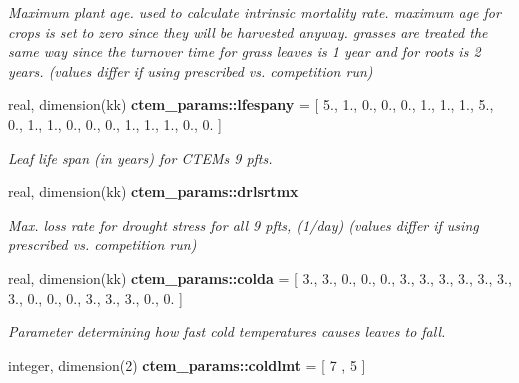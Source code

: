 \begin{DoxyCompactItemize}
\begin{DoxyCompactList}\small\item\em Maximum plant age. used to calculate intrinsic mortality rate. maximum age for crops is set to zero since they will be harvested anyway. grasses are treated the same way since the turnover time for grass leaves is 1 year and for roots is 2 years. (values differ if using prescribed vs. competition run) \end{DoxyCompactList}\item 
\hypertarget{namespacectem__params_aa093866c5338fea3488dc5cfdb9449af}{}real, dimension(kk) {\bfseries ctem\+\_\+params\+::lfespany} = \mbox{[} 5., 1., 0., 0., 0., 1., 1., 1., 5., 0., 1., 1., 0., 0., 0., 1., 1., 1., 0., 0. \mbox{]}\label{namespacectem__params_aa093866c5338fea3488dc5cfdb9449af}

\begin{DoxyCompactList}\small\item\em Leaf life span (in years) for C\+T\+E\+M\textquotesingle{}s 9 pfts. \end{DoxyCompactList}\item 
\hypertarget{namespacectem__params_adcdbf5080dbbe4117e28dad60b76a0d9}{}real, dimension(kk) {\bfseries ctem\+\_\+params\+::drlsrtmx}\label{namespacectem__params_adcdbf5080dbbe4117e28dad60b76a0d9}

\begin{DoxyCompactList}\small\item\em Max. loss rate for drought stress for all 9 pfts, (1/day) (values differ if using prescribed vs. competition run) \end{DoxyCompactList}\item 
\hypertarget{namespacectem__params_a261cdad7b84fcd118ef12b82da029bb7}{}real, dimension(kk) {\bfseries ctem\+\_\+params\+::colda} = \mbox{[} 3., 3., 0., 0., 0., 3., 3., 3., 3., 3., 3., 3., 0., 0., 0., 3., 3., 3., 0., 0. \mbox{]}\label{namespacectem__params_a261cdad7b84fcd118ef12b82da029bb7}

\begin{DoxyCompactList}\small\item\em Parameter determining how fast cold temperatures causes leaves to fall. \end{DoxyCompactList}\item 
\hypertarget{namespacectem__params_a3eee73b19e09e9aab077477b6d1d9419}{}integer, dimension(2) {\bfseries ctem\+\_\+params\+::coldlmt} = \mbox{[} 7 , 5 \mbox{]}\label{namespacectem__params_a3eee73b19e09e9aab077477b6d1d9419}


\end{DoxyCompactItemize}
